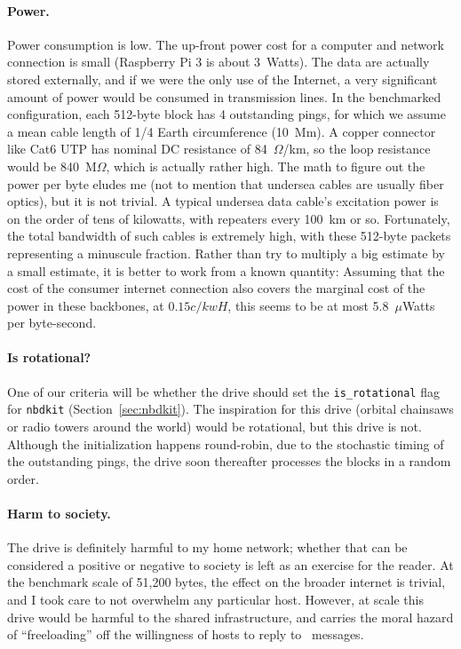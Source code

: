 \documentclass[twocolumn]{article}
\begin{document}
\paragraph{Power.} Power consumption is low. The up-front power cost for
a computer and network connection is small (Raspberry Pi 3 is about
3~Watts). The data are actually stored externally, and if we were the
only use of the Internet, a very significant amount of power would be
consumed in transmission lines. In the benchmarked configuration, each
512-byte block has 4 outstanding pings, for which we assume a mean
cable length of 1/4 Earth circumference (10~Mm). A copper connector
like Cat6 UTP has nominal DC resistance of 84~$\Omega$/km, so the loop
resistance would be 840~M$\Omega$, which is actually rather high. The
math to figure out the power per byte eludes me (not to mention that
undersea cables are usually fiber optics), but it is not trivial. A
typical undersea data cable's excitation power is on the order of tens
of kilowatts, with repeaters every 100~km or so. Fortunately, the
total bandwidth of such cables is extremely high, with these 512-byte
packets representing a minuscule fraction. Rather than try to multiply
a big estimate by a small estimate, it is better to work from a known
quantity: Assuming that the cost of the consumer internet connection
also covers the marginal cost of the power in these backbones, at
$0.15c/kwH$, this seems to be at most 5.8~$\mu$Watts per byte-second.


\paragraph{Is rotational?} One of our criteria will be whether the
drive should set the \verb+is_rotational+ flag for {\tt nbdkit}
(Section~\ref{sec:nbdkit}). The inspiration for this drive (orbital
chainsaws or radio towers around the world) would be rotational, but
this drive is not. Although the initialization happens round-robin,
due to the stochastic timing of the outstanding pings, the drive soon
thereafter processes the blocks in a random order.

\paragraph{Harm to society.} The drive is definitely harmful to my
home network; whether that can be considered a positive or negative to
society is left as an exercise for the reader. At the benchmark scale
of 51,200 bytes, the effect on the broader internet is trivial, and I
took care to not overwhelm any particular host. However, at scale
this drive would be harmful to the shared infrastructure, and
carries the moral hazard of ``freeloading'' off the willingness of
hosts to reply to \icmpecho\ messages.
\end{document}
